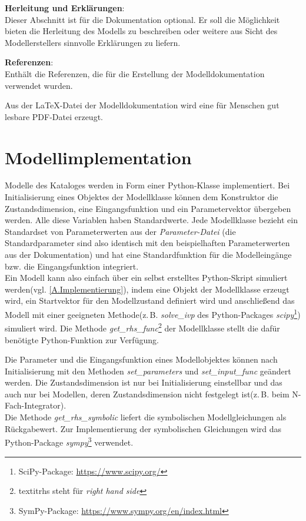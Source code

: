 \textbf{Herleitung und Erklärungen}:\\
Dieser Abschnitt ist für die Dokumentation optional. Er soll die Möglichkeit bieten die Herleitung des Modells zu beschreiben oder weitere aus Sicht des Modellerstellers sinnvolle Erklärungen zu liefern.

\textbf{Referenzen}:\\
Enthält die Referenzen, die für die Erstellung der Modelldokumentation verwendet wurden.

Aus der \LaTeX-Datei der Modelldokumentation wird eine für Menschen gut lesbare PDF-Datei erzeugt. 

\section{Modellimplementation}
\label{Ch:Ergebnisse:Sec:Implementation}
Modelle des Kataloges werden in Form einer Python-Klasse implementiert. Bei Initialisierung eines Objektes der Modellklasse können dem Konstruktor die Zustandsdimension, eine Eingangsfunktion und ein Parametervektor übergeben werden. Alle diese Variablen haben Standardwerte. Jede Modellklasse bezieht ein Standardset von Parameterwerten aus der \textit{Parameter-Datei} (die Standardparameter sind also identisch mit den beispielhaften Parameterwerten aus der Dokumentation) und hat eine Standardfunktion für die Modelleingänge bzw. die Eingangsfunktion integriert.\\ 
Ein Modell kann also einfach über ein selbst erstelltes Python-Skript simuliert werden(vgl. \ref{A.Implementierung}), indem eine Objekt der Modellklasse erzeugt wird, ein Startvektor für den Modellzustand definiert wird und anschließend das Modell mit einer geeigneten Methode(z.\,B. \textit{solve\_ivp} des Python-Packages \textit{scipy}\footnote{SciPy-Package: \url{https://www.scipy.org/}}) simuliert wird. Die Methode \textit{get\_rhs\_func}\footnote{textit{rhs} steht für \textit{right hand side}} der Modellklasse stellt die dafür benötigte Python-Funktion zur Verfügung.

Die Parameter und die Eingangsfunktion eines Modellobjektes können nach Initialisierung mit den Methoden \textit{set\_parameters} und \textit{set\_input\_func} geändert werden. Die Zustandsdimension ist nur bei Initialisierung einstellbar und das auch nur bei Modellen, deren Zustandsdimension nicht festgelegt ist(z.\,B. beim N-Fach-Integrator).\\
Die Methode \textit{get\_rhs\_symbolic} liefert die symbolischen Modellgleichungen als Rückgabewert. Zur Implementierung der symbolischen Gleichungen wird das Python-Package \textit{sympy}\footnote{SymPy-Package: \url{https://www.sympy.org/en/index.html}} verwendet.

